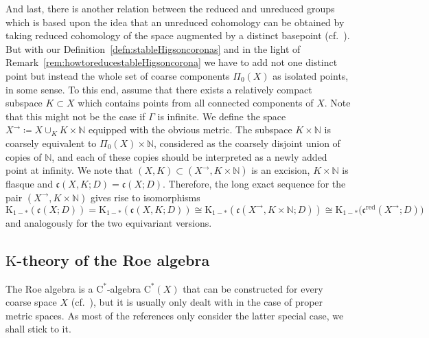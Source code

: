 \documentclass[pdftex]{sigma}
\numberwithin{equation}{section}
\theoremstyle{definition}
\newcommand{\N}{\mathbb{N}}
\newcommand{\K}{\mathrm{K}}
\newcommand{\textCstar}{\ensuremath{\mathrm{C}^*\!}}
\newcommand{\Roe}{\mathrm{C}^*}
\newcommand{\sHigCor}{\mathfrak{c}}
\newcommand{\sHigCorRed}{\mathfrak{c}^{\mathrm{red}}}
\newcommand{\coarsecomp}{\Pi_0}
\begin{document}
And last, there is another relation between the reduced and unreduced groups which is based upon the idea that an unreduced cohomology can be obtained by taking reduced cohomology of the space augmented by a distinct basepoint (cf.\ \cite[Section 6]{WulffCoassemblyRinghomo}). But with our Definition~\ref{defn:stableHigsoncoronas} and in the light of Remark~\ref{rem:howtoreducestableHigsoncorona} we have to add not one distinct point but instead the whole set of coarse components $\coarsecomp(X)$ as isolated points, in some sense.
To this end, assume that there exists a relatively compact subspace $K\subset X$ which contains points from all connected components of $X$. Note that this might not be the case if $\Gamma$ is infinite. We define the space $X^\to\coloneqq X\cup_KK\times\N$ equipped with the obvious metric. The subspace $K\times\N$ is coarsely equivalent to $\coarsecomp(X)\times\N$, considered as the coarsely disjoint union of copies of $\N$, and each of these copies should be interpreted as a newly added point at infinity. We note that $(X,K)\subset (X^\to,K\times\N)$ is an excision, $K\times\N$ is flasque and $\sHigCor(X,K;D)=\sHigCor(X;D)$. Therefore, the long exact sequence for the pair $(X^\to,K\times\N)$ gives rise to isomorphisms
\[
\K_{1-*}(\sHigCor(X;D))=\K_{1-*}(\sHigCor(X,K;D))\cong \K_{1-*}(\sHigCor(X^\to,K\times\N;D))\cong \K_{1-*}\big(\sHigCorRed(X^\to;D)\big)
\]
and analogously for the two equivariant versions.

\subsection[K-theory of the Roe algebra]{$\boldsymbol{\K}$-theory of the Roe algebra}\label{sec:RoeAlg}

The Roe algebra is a \textCstar-algebra $\Roe(X)$ that can be constructed for every coarse space $X$ (cf.\ \cite[Section~4.4]{RoeCoarseGeometry}), but it is usually only dealt with in the case of proper metric spaces. As most of the references only consider the latter special case, we shall stick to it.
\end{document}
